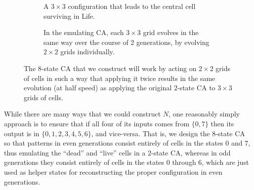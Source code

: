 \begin{figure}[!htb]
	\centering
	\begin{subfigure}{.37\textwidth}
		\centering
		  
		\caption{A $3 \times 3$ configuration that leads to the central cell surviving in Life.}
		\label{fig:0e0p_single_transition}
	\end{subfigure} \hfill \begin{subfigure}{.6\textwidth}
		\centering
		    
		\caption{In the emulating CA, each $3 \times 3$ grid evolves in the same way over the course of $2$ generations, by evolving $2 \times 2$ grids individually.}
		\label{fig:0e0p_double_transition_em}
	\end{subfigure}
	\caption{The $8$-state CA that we construct will work by acting on $2 \times 2$ grids of cells in such a way that applying it twice results in the same evolution (at half speed) as applying the original $2$-state CA to $3 \times 3$ grids of cells.}\label{fig:0e0p_double_transition}
\end{figure}

While there are many ways that we could construct $N$, one reasonably simply approach is to ensure that if all four of its inputs comes from $\{0,7\}$ then its output is in $\{0,1,2,3,4,5,6\}$, and vice-versa. That is, we design the $8$-state CA so that patterns in even generations consist entirely of cells in the states $0$ and $7$, thus emulating the ``dead'' and ``live'' cells in a $2$-state CA, whereas in odd generations they consist entirely of cells in the states $0$ through $6$, which are just used as helper states for reconstructing the proper configuration in even generations.

